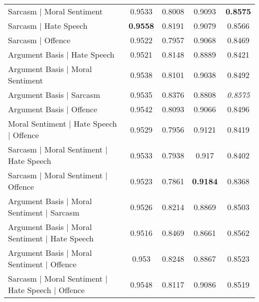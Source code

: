 \begin{table}[]
\begin{tabular}{l|cccc}
    Sarcasm | Moral Sentiment                                          & 0.9533          & 0.8008          & 0.9093          & \textbf{0.8575} \\
    Sarcasm | Hate Speech                                              & \textbf{0.9558} & 0.8191          & 0.9079          & 0.8566          \\
    Sarcasm | Offence                                                  & 0.9522          & 0.7957          & 0.9068          & 0.8469          \\
    Argument Basis | Hate Speech                                       & 0.9521          & 0.8148          & 0.8889          & 0.8421          \\
    Argument Basis | Moral Sentiment                                   & 0.9538          & 0.8101          & 0.9038          & 0.8492          \\
    Argument Basis | Sarcasm                                           & 0.9535          & 0.8376          & 0.8808          & \textit{0.8575} \\
    Argument Basis | Offence                                           & 0.9542          & 0.8093          & 0.9066          & 0.8496          \\
    Moral Sentiment | Hate Speech | Offence                            & 0.9529          & 0.7956          & 0.9121          & 0.8419          \\
    Sarcasm | Moral Sentiment | Hate Speech                            & 0.9533          & 0.7938          & 0.917           & 0.8402          \\
    Sarcasm | Moral Sentiment | Offence                                & 0.9523          & 0.7861          & \textbf{0.9184} & 0.8368          \\
    Argument Basis | Moral Sentiment | Sarcasm                         & 0.9526          & 0.8214          & 0.8869          & 0.8503          \\
    Argument Basis | Moral Sentiment | Hate Speech                     & 0.9516          & 0.8469          & 0.8661          & 0.8562          \\
    Argument Basis | Moral Sentiment | Offence                         & 0.953           & 0.8248          & 0.8867          & 0.8523          \\
    Sarcasm | Moral Sentiment | Hate Speech | Offence                  & 0.9548          & 0.8117          & 0.9086          & 0.8519          \\

\end{tabular}
\end{table}
